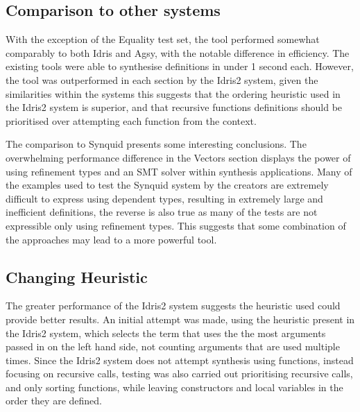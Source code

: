 \documentclass[a4paper]{article}
\begin{document}
\subsection{Comparison to other systems}
\label{sec:orga2f8b7e}

With the exception of the Equality test set, the tool performed somewhat
comparably to both Idris and Agsy, with the notable difference in efficiency.
The existing tools were able to synthesise definitions in under 1 second each.
However, the tool was outperformed in each section by the Idris2 system,
given the similarities within the systems this suggests that the
ordering heuristic used in the Idris2 system is superior, and that
recursive functions definitions should be prioritised over attempting each
function from the context.

The comparison to Synquid presents some interesting conclusions.
The overwhelming performance difference in the Vectors section  
displays the power of using refinement types and an SMT solver
within synthesis applications. Many of the examples used to test
the Synquid system by the creators are extremely difficult to
express using dependent types, resulting in extremely large and
inefficient definitions, the reverse is also true as many of the
tests are not expressible only using refinement types. This suggests
that some combination of the approaches may lead to a more powerful
tool. 

\subsection{Changing Heuristic}
The greater performance of the Idris2 system suggests the heuristic used
could provide better results. An initial attempt was made, using the
heuristic present in the Idris2 system, which selects the term that uses the
the most arguments passed in on the left hand side, not counting arguments
that are used multiple times. Since the Idris2 system does not attempt
synthesis using functions, instead focusing on recursive calls, 
testing was also carried out prioritising recursive calls, and only
sorting functions, while leaving constructors and local variables in the
order they are defined.
\end{document}
